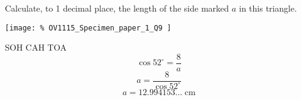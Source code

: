 \question Calculate, to 1 decimal place, 
the length of the side marked $a$ in this triangle.
\par
\begin{center}
	\texttt{[image: \%
		OV1115\_Specimen\_paper\_1\_Q9
	]}
\end{center}
\begin{solution}
	SOH CAH TOA
	\[
		\cos{52^{\circ}} = \frac{8}{a}
	\]
	\[
		a = \frac{8}{\cos{52^{\circ}}}
	\]
	\[
		a = 12.994153\ldots \; \text{cm}
	\]
\end{solution}

